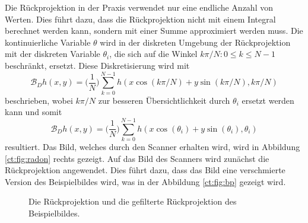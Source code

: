 Die Rückprojektion in der Praxis verwendet nur eine endliche Anzahl von Werten. Dies führt dazu, dass die Rückprojektion nicht mit einem Integral berechnet werden kann, sondern mit einer Summe approximiert werden muss. 
Die kontinuierliche Variable $\theta$ wird in der diskreten Umgebung der Rückprojektion mit der diskreten Variable $\theta_i$, die sich auf die Winkel ${k\pi/N: 0\le k \le N-1}$ beschränkt, ersetzt. Diese Diskretisierung wird mit 
\begin{equation}\label{ct:discreteBP}
		\mathscr{B}_Dh(x, y) = \biggl(\dfrac{1}{N}\biggr)\sum_{k=0}^{N-1} h(x\cos(k\pi/N)+y\sin(k\pi/N), k\pi/N)
\end{equation}
beschrieben, wobei $k\pi/N$
zur besseren Übersichtlichkeit
durch $\theta_i$
ersetzt werden kann und somit
\begin{equation}\label{ct:discreteBP_w_theta}
	\mathscr{B}_Dh(x, y) = \biggl(\dfrac{1}{N}\biggr)\sum_{k=0}^{N-1} h(x\cos(\theta_i)+y\sin(\theta_i), \theta_i)
\end{equation}
resultiert.
Das Bild, welches durch den Scanner erhalten wird, wird in Abbildung \ref{ct:fig:radon} rechts gezeigt.
Auf das Bild des Scanners wird zunächst die Rückprojektion angewendet. Dies führt dazu, dass das Bild eine \glqq verschmierte\grqq{} Version des Beispielbildes wird, was in der Abbildung \ref{ct:fig:bp} gezeigt wird.

\begin{figure}
	\centering
	\caption{Die Rückprojektion und die gefilterte Rückprojektion des Beispielbildes.}
\end{figure}

